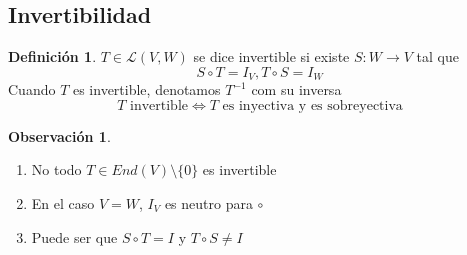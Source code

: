 \documentclass[11pt]{book}
\theoremstyle{definition}
\newtheorem{defn}{Definición}[section]
\newtheorem{obs}{Observación}[section]
\begin{document}
\subsection{Invertibilidad}
\begin{defn}
$T\in\mathcal{L}(V,W)$ se dice invertible si existe $S:W\rightarrow V$ tal que
\begin{equation}
S\circ T=I_V, T\circ S=I_W
\end{equation}
Cuando $T$ es invertible, denotamos $T^{-1}$ com su inversa
\[T\textrm{ invertible}\iff T\textrm{ es inyectiva y es sobreyectiva}\]
\end{defn}
\begin{obs}
\
\begin{enumerate}
	\item No todo $T\in End(V)\setminus\{0\}$ es invertible
	
	\item En el caso $V=W$, $I_V$ es neutro para $\circ$
	
	\item Puede ser que $S\circ T=I$ y $T\circ S\neq I$
\end{enumerate}
\end{obs}
\end{document}
